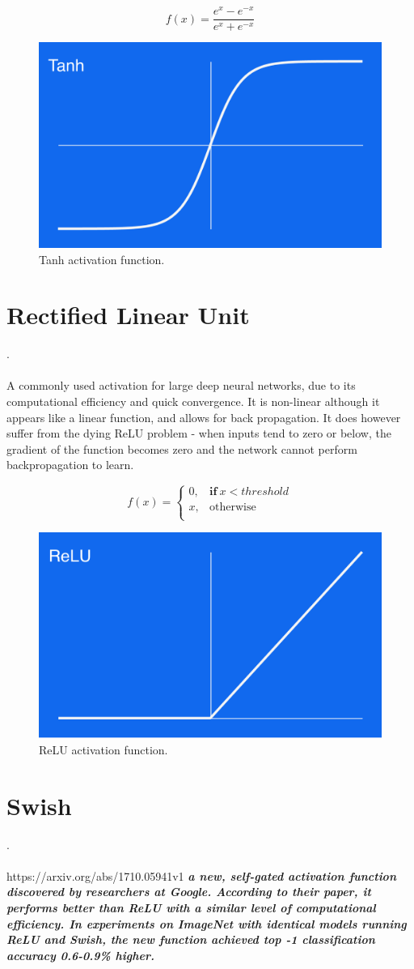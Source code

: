 \begin{equation}
    f(x) = \frac {e^x - e^{-x}} {e^x + e^{-x}}
\end{equation}
\begin{figure}[H]
\centering
\includegraphics[width=.265\textwidth]{4fig/tanh.png}
\caption{Tanh activation function.}
\end{figure}


\section{Rectified Linear Unit}.\\\\
A commonly used activation for large deep neural networks, due to its computational efficiency and quick convergence. It is non-linear although it appears like a linear function, and allows for back propagation. It does however suffer from the dying ReLU problem - when inputs tend to zero or below, the gradient of the function becomes zero and the network cannot perform backpropagation to learn.

\begin{equation}
f(x) =
    \begin{cases}
      0 , & \mathbf{if} \ x < threshold \\
      x , & \text{otherwise}\\
    \end{cases}
  \end{equation}
\begin{figure}[H]
\centering
\includegraphics[width=.265\textwidth]{4fig/relu.png}
\caption{ReLU activation function.}
\end{figure}



\section{Swish}.\\\\
https://arxiv.org/abs/1710.05941v1
\textbf{\textit{a new, self-gated activation function discovered by researchers at Google. According to their paper, it performs better than ReLU with a similar level of computational efficiency. In experiments on ImageNet with identical models running ReLU and Swish, the new function achieved top -1 classification accuracy 0.6-0.9\% higher.}}

